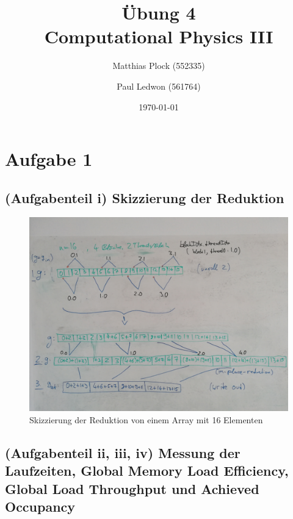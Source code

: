 \documentclass[10pt,a4paper]{article}
\title{Übung 4 \\Computational Physics III}
\author{Matthias Plock (552335) \and Paul Ledwon (561764)} %
\date{\today}
\begin{document}
\maketitle
\tableofcontents

\pagestyle{myheadings}                  %

\section{Aufgabe 1}

\subsection{(Aufgabenteil i) \newline
  Skizzierung der Reduktion}

\begin{figure}[H]
  \centering
  \includegraphics[width=\textwidth]{../figures/reduceUnrollingSketch.jpg}
  \caption{Skizzierung der Reduktion von einem Array mit 16 Elementen}
  \label{fig:skizzierung_reduktion}
\end{figure}

\subsection{(Aufgabenteil ii, iii, iv) \newline
  Messung der Laufzeiten, Global Memory Load Efficiency, Global Load
  Throughput und Achieved Occupancy}
\end{document}
